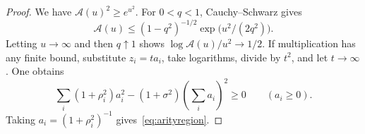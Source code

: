 \documentclass[10pt,a4paper]{amsart}
\begin{document}
\begin{proof}
We have $\mathcal A(u)^2\ge e^{u^2}$. For $0<q<1$, Cauchy--Schwarz gives
\[
 \mathcal A(u)\le(1-q^2)^{-1/2}\exp\big(u^2/(2q^2)\big).
\]
Letting $u\to\infty$ and then $q\uparrow1$ shows
$\log\mathcal A(u)/u^2\to1/2$.
If multiplication has any finite bound, substitute $z_i=ta_i$, take logarithms, divide by $t^2$, and let $t\to\infty$. One obtains
\[
 \sum_i(1+\rho_i^2)a_i^2-(1+\sigma^2)\left(\sum_i a_i\right)^2\ge0
 \qquad(a_i\ge0).
\]
Taking $a_i=(1+\rho_i^2)^{-1}$ gives~\eqref{eq:arityregion}.
\end{proof}
\end{document}
